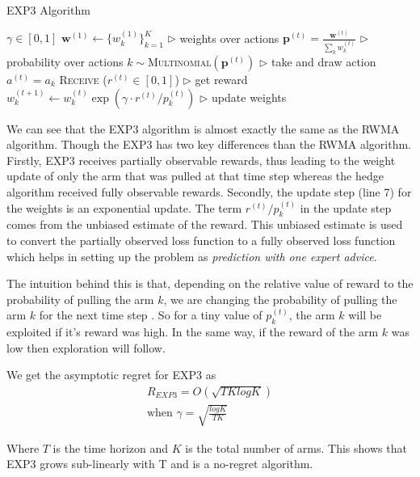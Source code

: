 \documentclass[11pt]{article}
\begin{document}
\begin{algorithm}[H]
\caption{EXP3 Algorithm\cite{exp3}}
\label{algo:exp3}
\begin{algorithmic}[1]
\REQUIRE $\gamma \in [0, 1]$
\STATE $\pmb{w}^{(1)} \leftarrow \{w_k^{(1)} \}_{k=1}^{K}$ \hfill $\triangleright$ weights over actions
\STATE $\pmb{p}^{(t)} = \frac{\pmb{w}^{(t)}}{\sum_k w_k^{(t)}}$ \hfill $\triangleright$ probability over actions
\STATE $k \sim $\textsc{Multinomial}$(\pmb{p}^{(t)})$ \hfill $\triangleright$ take and draw action
\STATE $a^{(t)}=a_k$
\STATE \textsc{Receive} ($r^{(t)}\in [0, 1]$) \hfill $\triangleright$ get reward
\STATE $w_{k}^{(t+1)}\leftarrow w_{k}^{(t)} \exp{(\gamma \cdot r^{(t)}/p_k^{(t)})}$ \hfill $\triangleright$ update weights
\ENDFOR
\end{algorithmic}
\end{algorithm}

We can see that the EXP3 algorithm is almost exactly the same as the RWMA algorithm. Though the EXP3 has two key differences than the RWMA algorithm. Firstly, EXP3 receives partially observable rewards, thus leading to the weight update of only the arm that was pulled at that time step whereas the hedge algorithm received fully observable rewards. Secondly, the update step (line 7) for the weights is an exponential update. The term $r^{(t)}/p_k^{(t)}$ in the update step comes from the unbiased estimate of the reward. This unbiased estimate is used to convert the partially observed loss function to a fully observed loss function which helps in setting up the problem as \textit{prediction with one expert advice}.

The intuition behind this is that, depending on the relative value of reward to the probability of pulling the arm $k$, we are changing the probability of pulling the arm $k$ for the next time step . So for a tiny value of $p_k^{(t)}$, the arm $k$ will be exploited if it's reward was high. In the same way, if the reward of the arm $k$ was low then exploration will follow.

We get the asymptotic regret for EXP3 as
\begin{align}
    R_{EXP3} = O(\sqrt{TKlogK}) \\
    \text{when } \gamma = \sqrt{\frac{logK}{TK}}
\end{align}
 
Where $T$ is the time horizon and $K$ is the total number of arms. This shows that EXP3 grows sub-linearly with T and is a no-regret algorithm.
\end{document}
